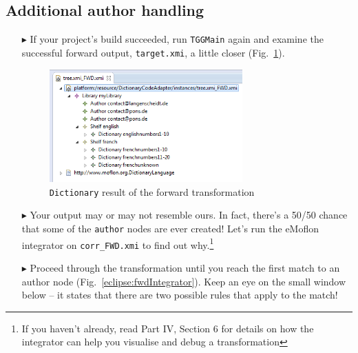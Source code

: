 \newpage
\hypertarget{t2m close}{}
\subsection{Additional author handling}
\genHeader

\begin{itemize}

\item[$\blacktriangleright$] If your project's build succeeded, run \texttt{TGGMain} again and examine the successful forward output, 
\texttt{target.xmi}, a little closer (Fig.~\ref{eclipse:generatedFwdTrsfm}).

\vspace{0.5cm}

\begin{figure}[htbp]
\begin{center}
  \includegraphics[width=0.7\textwidth]{eclipse_generatedForwardTransformation}
  \caption{\texttt{Dictionary} result of the forward transformation}
  \label{eclipse:generatedFwdTrsfm}
\end{center}
\end{figure}

\vspace{0.5cm}

\item[$\blacktriangleright$] Your output may or may not resemble ours. In fact, there's a 50/50 chance that some of the \texttt{author} nodes are ever created!
Let's run the eMoflon integrator on \texttt{corr\_FWD.xmi} to find out why.\footnote{If you haven't already, read Part IV, Section 6 for details on how the
integrator can help you visualise and debug a transformation}

\vspace{0.5cm}

\item[$\blacktriangleright$] Proceed through the transformation until you reach the first match to an author node (Fig.~\ref{eclipse:fwdIntegrator}). Keep an
eye on the small window below -- it states that there are two possible rules that apply to the match!


\end{itemize}
